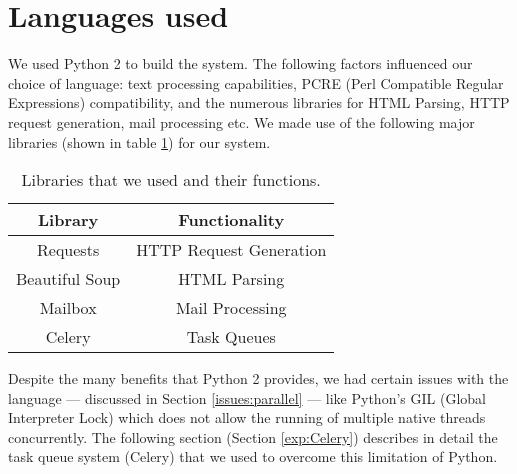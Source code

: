 \section{Languages used}

We used Python 2 to build the system. The following factors influenced our choice of language: text processing capabilities, PCRE (Perl Compatible Regular Expressions) compatibility, and the numerous libraries for HTML Parsing, HTTP request generation, mail processing etc.
We made use of the following major libraries (shown in table \ref{tab:libs}) for our system.

\begin{table}[!htbp]
	\centering
	\begin{tabular}{|c|c|}
		\hline
		\multicolumn{1}{|c|}{\textbf{Library}} &
		\multicolumn{1}{c|}{\textbf{Functionality}} \\
		\hline
		Requests & HTTP Request Generation\\
		\hline
		Beautiful Soup & HTML Parsing\\
		\hline
		Mailbox & Mail Processing\\
		\hline
		Celery & Task Queues\\
		\hline
	\end{tabular}
	\caption{Libraries that we used and their functions.}
	\label{tab:libs}
\end{table}

Despite the many benefits that Python 2 provides, we had certain issues with the language --- discussed in Section \ref{issues:parallel} --- like Python's GIL (Global Interpreter Lock) which does not allow the running of multiple native threads concurrently.
The following section (Section \ref{exp:Celery}) describes in detail the task queue system (Celery) that we used to overcome this limitation of Python.
